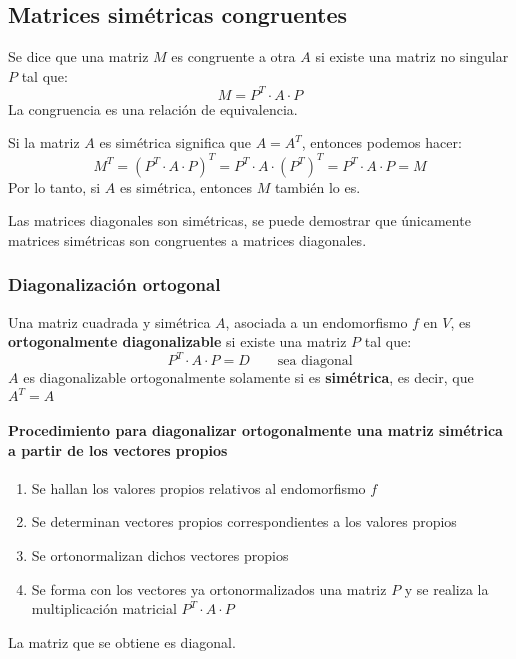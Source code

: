 

\subsection{Matrices simétricas congruentes}

Se dice que una matriz \(M\) es congruente a otra \(A\) si existe una matriz no singular \(P\) tal que:
\[
  M = P^T \cdot A \cdot P
\]
La congruencia es una relación de equivalencia.

Si la matriz \(A\) es simétrica significa que \(A = A^T\), entonces podemos hacer:
\[
  M^T = (P^T \cdot A \cdot P)^T = P^T \cdot A \cdot (P^T)^T = P^T \cdot A \cdot P = M
\]
Por lo tanto, si \(A\) es simétrica, entonces \(M\) también lo es.

Las matrices diagonales son simétricas, se puede demostrar que únicamente matrices simétricas son congruentes a matrices diagonales.

\subsubsection{Diagonalización ortogonal}

Una matriz cuadrada y simétrica \(A\), asociada a un endomorfismo \(f\) en \(V\), es \textbf{ortogonalmente diagonalizable} si existe una matriz \(P\) tal que:
\[
  P^T \cdot A \cdot P = D \qquad \text{sea diagonal}
\]
\(A\) es diagonalizable ortogonalmente solamente si es \textbf{simétrica}, es decir, que \(A^T=A\)

\paragraph{Procedimiento para diagonalizar ortogonalmente una matriz simétrica a partir de los vectores propios}

\begin{enumerate}[label=\(\arabic{*}^\circ\)]
  \item Se hallan los valores propios relativos al endomorfismo \(f\)
  \item Se determinan vectores propios correspondientes a los valores propios
  \item Se ortonormalizan dichos vectores propios
  \item Se forma con los vectores ya ortonormalizados una matriz \(P\) y se realiza la multiplicación matricial \(P^T \cdot A \cdot P\)
\end{enumerate}
La matriz que se obtiene es diagonal.

